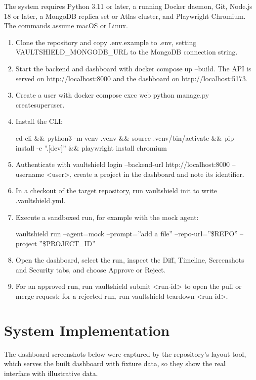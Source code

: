 \documentclass[12pt,a4paper,oneside]{report}
\providecommand{\tightlist}{\setlength{\itemsep}{0pt}\setlength{\parskip}{0pt}}
\begin{document}
The system requires Python 3.11 or later, a running Docker daemon, Git, Node.js 18 or later, a MongoDB replica set or Atlas cluster, and Playwright Chromium. The commands assume macOS or Linux.

\begin{enumerate}
\def\labelenumi{\arabic{enumi}.}
\tightlist
\item
  Clone the repository and copy .env.example to .env, setting VAULTSHIELD\_\allowbreak{}MONGODB\_\allowbreak{}URL to the MongoDB connection string.
\item
  Start the backend and dashboard with docker compose up --build. The API is served on http://localhost:8000 and the dashboard on http://localhost:5173.
\item
  Create a user with docker compose exec web python manage.py createsuperuser.
\item
  Install the CLI:


cd cli \&\& python3 -m venv .venv \&\& source .venv/bin/activate \&\& pip install -e ''.[dev]'' \&\& playwright install chromium
\item
  Authenticate with vaultshield login --backend-url http://localhost:8000 --username <user>, create a project in the dashboard and note its identifier.
\item
  In a checkout of the target repository, run vaultshield init to write .vaultshield.yml.
\item
  Execute a sandboxed run, for example with the mock agent:


vaultshield run --agent=mock --prompt=''add a file'' --repo-url=''\$REPO'' --project ''\$PROJECT\_ID''
\item
  Open the dashboard, select the run, inspect the Diff, Timeline, Screenshots and Security tabs, and choose Approve or Reject.
\item
  For an approved run, run vaultshield submit <run-id> to open the pull or merge request; for a rejected run, run vaultshield teardown <run-id>.
\end{enumerate}

\section{System Implementation}\label{system-implementation}

The dashboard screenshots below were captured by the repository's layout tool, which serves the built dashboard with fixture data, so they show the real interface with illustrative data.
\end{document}
